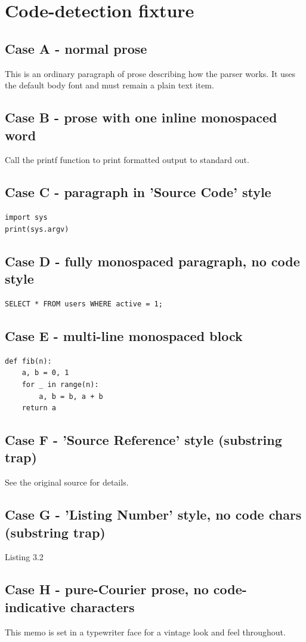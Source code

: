 \documentclass[11pt,a4paper]{article}
\begin{document}
\section{Code-detection fixture}

\subsection{Case A - normal prose}

This is an ordinary paragraph of prose describing how the parser works. It uses the default body font and must remain a plain text item.

\subsection{Case B - prose with one inline monospaced word}

Call the printf function to print formatted output to standard out.

\subsection{Case C - paragraph in 'Source Code' style}

\begin{verbatim}
import sys
print(sys.argv)
\end{verbatim}

\subsection{Case D - fully monospaced paragraph, no code style}

\begin{verbatim}
SELECT * FROM users WHERE active = 1;
\end{verbatim}

\subsection{Case E - multi-line monospaced block}

\begin{verbatim}
def fib(n):
    a, b = 0, 1
    for _ in range(n):
        a, b = b, a + b
    return a
\end{verbatim}

\subsection{Case F - 'Source Reference' style (substring trap)}

See the original source for details.

\subsection{Case G - 'Listing Number' style, no code chars (substring trap)}

Listing 3.2

\subsection{Case H - pure-Courier prose, no code-indicative characters}

This memo is set in a typewriter face for a vintage look and feel throughout.
\end{document}
